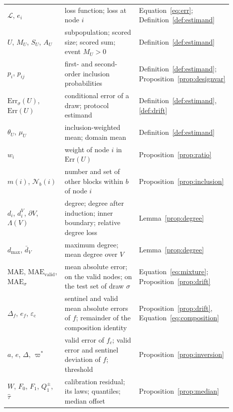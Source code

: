 \begin{tabular}{>{\raggedright\arraybackslash}p{0.30\linewidth}>{\raggedright\arraybackslash}p{0.38\linewidth}>{\raggedright\arraybackslash}p{0.22\linewidth}}
$\mathcal{L}$, $e_i$ & loss function; loss at node $i$ & Equation~\eqref{eq:err}; Definition~\ref{def:estimand} \\
$U$, $M_U$, $S_U$, $A_U$ & subpopulation; scored size; scored sum; event $M_U > 0$ & Definition~\ref{def:estimand} \\
$p_i$, $p_{ij}$ & first- and second-order inclusion probabilities & Definition~\ref{def:estimand}; Proposition~\ref{prop:designvar} \\
$\mathrm{Err}_\sigma(U)$, $\mathrm{Err}(U)$ & conditional error of a draw; protocol estimand & Definition~\ref{def:estimand}, \ref{def:drift} \\
$\theta_U$, $\mu_U$ & inclusion-weighted mean; domain mean & Definition~\ref{def:estimand} \\
$w_i$ & weight of node $i$ in $\mathrm{Err}(U)$ & Proposition~\ref{prop:ratio} \\
$m(i)$, $\mathcal{N}_b(i)$ & number and set of other blocks within $b$ of node $i$ & Proposition~\ref{prop:inclusion} \\
$d_i$, $d_i^V$, $\partial V$, $\Lambda(V)$ & degree; degree after induction; inner boundary; relative degree loss & Lemma~\ref{prop:degree} \\
$d_{\max}$, $\bar d_V$ & maximum degree; mean degree over $V$ & Lemma~\ref{prop:degree} \\
$\mathrm{MAE}$, $\mathrm{MAE}_{\mathrm{valid}}$, $\mathrm{MAE}_{\sigma}$ & mean absolute error; on the valid nodes; on the test set of draw $\sigma$ & Equation~\eqref{eq:mixture}; Proposition~\ref{prop:drift} \\
$\Delta_f$, $e_f$, $\varepsilon_{\mathrm{c}}$ & sentinel and valid mean absolute errors of $f$; remainder of the composition identity & Proposition~\ref{prop:drift}, Equation~\eqref{eq:composition} \\
$a$, $e$, $\Delta$, $\varpi^*$ & valid error of $f_c$; valid error and sentinel deviation of $f$; threshold & Proposition~\ref{prop:inversion} \\
$W$, $F_0$, $F_1$, $Q_1^{\pm}$, $\hat\tau$ & calibration residual; its laws; quantiles; median offset & Proposition~\ref{prop:median} \\
\bottomrule
\end{tabular}
